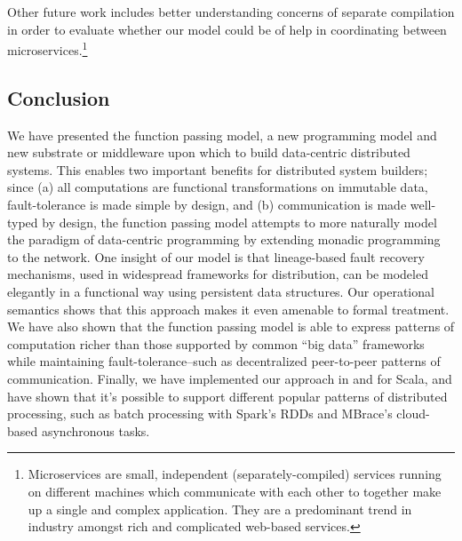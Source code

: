 \documentclass[preprint]{sigplanconf}
\theoremstyle{definition}
\theoremstyle{definition}
\begin{document}
Other future work includes better understanding concerns of separate compilation
in order to evaluate whether our model could be of help in coordinating between
microservices.\footnote{Microservices are small, independent
(separately-compiled) services running on different machines which communicate
with each other to together make up a single and complex application. They are a
predominant trend in industry amongst rich and complicated web-based services.}

\subsection{Conclusion}

We have presented the function passing model, a new programming model and new
substrate or middleware upon which to build data-centric distributed systems.
This enables two important benefits for distributed system builders; since (a)
all computations are functional transformations on immutable data,
fault-tolerance is made simple by design, and (b) communication is made
well-typed by design, the function passing model attempts to more naturally
model the paradigm of data-centric programming by extending monadic programming
to the network. One insight of our model is that lineage-based fault recovery
mechanisms, used in widespread frameworks for distribution, can be modeled
elegantly in a functional way using persistent data structures. Our operational
semantics shows that this approach makes it even amenable to formal treatment.
We have also shown that the function passing model is able to express patterns
of computation richer than those supported by common ``big data'' frameworks
while maintaining fault-tolerance--such as decentralized peer-to-peer patterns
of communication. Finally, we have implemented our approach in and for Scala,
and have shown that it's possible to support different popular patterns of
distributed processing, such as  batch processing with Spark's RDDs  and
MBrace's cloud-based asynchronous tasks.
\end{document}
